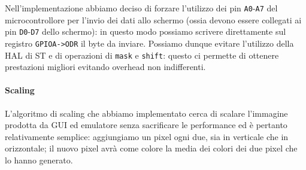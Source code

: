 \documentclass[hidelinks,12pt]{article}
\begin{document}
Nell'implementazione abbiamo deciso di forzare l'utilizzo dei pin
\texttt{A0}-\texttt{A7} del microcontrollore per l'invio dei dati allo schermo
(ossia devono essere collegati ai pin \texttt{D0}-\texttt{D7} dello schermo): in
questo modo possiamo scrivere direttamente sul registro \texttt{GPIOA->ODR} il
byte da inviare. Possiamo dunque evitare l'utilizzo della HAL di ST e di
operazioni di \texttt{mask} e \texttt{shift}: questo ci permette di ottenere
prestazioni migliori evitando overhead non indifferenti.

\paragraph{Scaling}
L'algoritmo di scaling che abbiamo implementato cerca di scalare l'immagine
prodotta da GUI ed emulatore senza sacrificare le performance ed è pertanto
relativamente semplice: aggiungiamo un pixel ogni due, sia in verticale che in
orizzontale; il nuovo pixel avrà come colore la media dei colori dei due pixel
che lo hanno generato.
\end{document}
